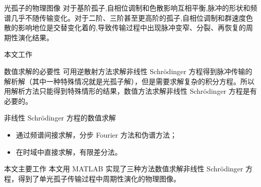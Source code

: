 \documentclass[aspectratio=169]{beamer}
\begin{document}
\begin{frame}{光孤子的物理图像}
  对于基阶孤子,自相位调制和色散影响互相平衡,脉冲的形状和频谱几乎不随传输变化。对于二阶、三阶甚至更高阶的孤子,自相位调制和群速度色散的影响地位是交替变化着的,导致传输过程中出现\textcolor{hghgreen}{脉冲变窄、分裂、再恢复的周期性演化结果}。
  \begin{figure}[tbp]
    \centering
    \addtocounter{figure}{-1}
  \end{figure}
\end{frame}

\begin{frame}{本文工作}
  \begin{block}{数值求解的必要性}
    可用逆散射方法求解非线性 Schr\"odinger 方程得到脉冲传输的解析解（其中一种特殊情况就是光孤子解），但是需要求解复杂的积分方程。所以用解析方法只能得到特殊情形的结果，数值方法求解非线性 Schr\"odinger 方程是有必要的。
  \end{block}
  \begin{exampleblock}{非线性 Schr\"odinger 方程的数值求解}
    \begin{itemize}
      \item 通过频谱间接求解，\textcolor{hghred}{分步 Fourier 方法}和\textcolor{hghred}{伪谱方法}；
      \item 在时域中直接求解，\textcolor{hghred}{有限差分法}。
    \end{itemize}
  \end{exampleblock}
  \begin{alertblock}{本文主要工作}
    本文\textcolor{hghpurple}{用 MATLAB }实现了\textcolor{hghred}{三种方法}数值求解非线性 Schr\"odinger 方程，\textcolor{hghgreen}{得到了单光孤子传输过程中周期性演化的物理图像}。
  \end{alertblock}
\end{frame}
\end{document}
